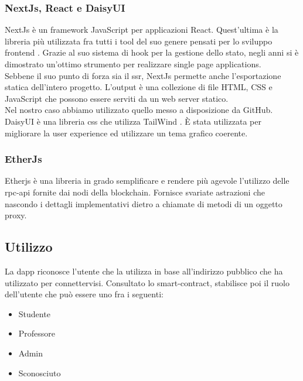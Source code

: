 \subsubsection{NextJs, React e DaisyUI}

NextJs è un framework JavaScript per applicazioni React.
Quest'ultima è la libreria più utilizzata fra tutti i tool del suo genere pensati per lo sviluppo frontend \cite{art:react-first}.
Grazie al suo sistema di hook per la gestione dello stato, negli anni si è dimostrato un'ottimo strumento per realizzare single page applications. \\
Sebbene il suo punto di forza sia il \gls{ssr}, NextJs permette anche l'esportazione statica dell'intero progetto.
L'output è una collezione di file HTML, CSS e JavaScript che possono essere serviti da un web server statico. \\
Nel nostro caso abbiamo utilizzato quello messo a disposizione da GitHub. \\
DaisyUI è una libreria css che utilizza TailWind \cite{soft:tailwind}.
È stata utilizzata per migliorare la user experience ed utilizzare un tema grafico coerente.

\subsubsection{EtherJs}

Etherjs è una libreria in grado semplificare e rendere più agevole l'utilizzo delle \gls{rpc-api} fornite dai nodi della blockchain.
Fornisce svariate astrazioni che nascondo i dettagli implementativi dietro a chiamate di metodi di un oggetto proxy. \\

\subsection{Utilizzo}

La \gls{dapp} riconosce l'utente che la utilizza in base all'indirizzo pubblico che ha utilizzato per connettervisi.
Consultato lo \gls{smart-contract}, stabilisce poi il ruolo dell'utente che può essere uno fra i seguenti:

\begin{itemize}
    \item Studente
    \item Professore
    \item Admin
    \item Sconosciuto
\end{itemize}

